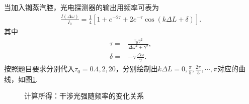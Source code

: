\documentclass{assignment}
\begin{document}
\begin{sol}
    当加入铷蒸汽腔，光电探测器的输出用频率可表为
    \begin{align}
        \frac{I(\Delta\omega)}{I_0}=\frac{1}{4}\left[1+e^{-2\tau}+2e^{-\tau}\cos\left(k\Delta L+\delta\right)\right].
    \end{align}
    其中
    \begin{align}
        \tau=&\frac{\tau_0\gamma^2}{\Delta\omega^2+\gamma^2},\\
        \delta=&-\tau\frac{\Delta\omega}{\gamma}.
    \end{align}
    按照题目要求分别代入$\tau_0=0.4,2,20$，分别绘制出$k\Delta L=0,\frac{\pi}{5},\frac{2\pi}{5},\cdots,\pi$对应的曲线，如图\ref{CalculatedSpectrum}.
    \begin{figure}[h]
        \centering
        \caption{计算所得：干涉光强随频率的变化关系}
        \label{CalculatedSpectrum}
    \end{figure}
\end{sol}
\end{document}
